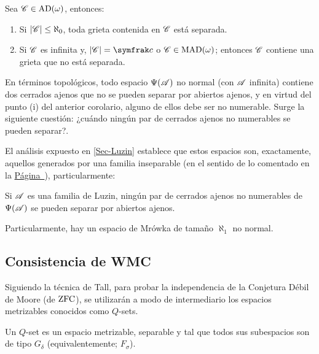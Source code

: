 \begin{corolario}\label{col-tra-interrelacion}
	Sea $\mathscr{C}\in \operatorname{AD}(\omega)$, entonces:
	\begin{enumerate}
		\item Si $|\mathscr{C}|\leq \aleph_0$, toda grieta contenida en $\mathscr{C}$ está separada.
		\item Si $\mathscr{C}$ es infinita y, $|\ms{C}|=\mathfrak{c}$ o $\mathscr{C}\in \operatorname{MAD}(\omega)$; entonces $\mathscr{C}$ contiene una grieta que no está separada.
	\end{enumerate}
\end{corolario}

En términos topológicos, todo espacio $\Psi(\mathscr{A})$ no normal (con $\mathscr{A}$ infinita) contiene dos cerrados ajenos que no se pueden separar por abiertos ajenos, y en virtud del punto (i) del anterior corolario, alguno de ellos debe ser no numerable. Surge la siguiente cuestión: ¿cuándo ningún par de cerrados ajenos no numerables se pueden separar?.

El análisis expuesto en \autoref{Sec-Luzin} establece que estos espacios son, exactamente, aquellos generados por una familia inseparable (en el sentido de lo comentado en la \hyperref[def-FamInseparable]{Página~\pageref{def-FamInseparable}}), particularmente:

\begin{corolario}\label{cor-MrowkaLuzin}
	Si $\mathscr{A}$ es una familia de Luzin, ningún par de cerrados ajenos no numerables de $\Psi(\mathscr{A})$ se pueden separar por abiertos ajenos.

	Particularmente, hay un espacio de Mrówka de tamaño $\aleph_1$ no normal.
\end{corolario}

\subsection{Consistencia de \textsf{WMC}}
\label{Sec-PDM}

Siguiendo la técnica de Tall, para probar la independencia de la Conjetura Débil de Moore (de $\operatorname{ZFC}$), se utilizarán a modo de intermediario los espacios metrizables conocidos como $Q$-sets.

\begin{definicion}\label{def-Qset}
	Un $Q$-set es un espacio metrizable, separable y tal que todos sus subespacios son de tipo $G_\delta$ (equivalentemente; $F_\sigma$).
\end{definicion}

